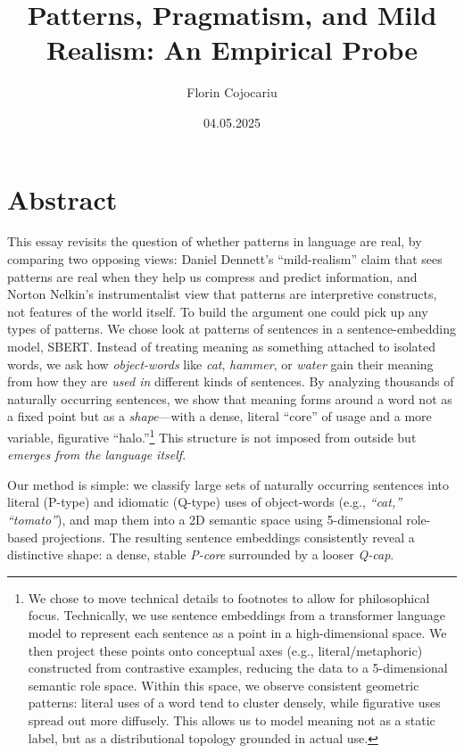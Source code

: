 \documentclass[12pt]{article}
\title{Patterns, Pragmatism, and Mild Realism: An Empirical Probe}
\author{Florin Cojocariu}
\date{04.05.2025}
\begin{document}
\maketitle
\clearpage
\tableofcontents
\setcounter{tocdepth}{3}
\clearpage
\section{Abstract}\label{abstract}

This essay revisits the question of whether patterns in language are real, by comparing two opposing views: Daniel Dennett's ``mild-realism'' claim that sees patterns are real when they help us compress and predict information, and Norton Nelkin's instrumentalist view that patterns are interpretive constructs, not features of the world itself. To build the argument one could pick up any types of patterns. We chose look at patterns of sentences in a sentence-embedding model, SBERT. Instead of treating meaning as something attached to isolated words, we ask how \emph{object-words} like \emph{cat}, \emph{hammer}, or \emph{water} gain their meaning from how they are \emph{used in} different kinds of sentences. By analyzing thousands of naturally occurring sentences, we show that meaning forms around a word not as a fixed point but as a \emph{shape}---with a dense, literal ``core'' of usage and a more variable, figurative ``halo.''\footnote{We chose to move technical details to footnotes to allow for philosophical focus. Technically, we use sentence embeddings from a transformer language model to represent each sentence as a point in a high-dimensional space. We then project these points onto conceptual axes (e.g., literal/metaphoric) constructed from contrastive examples, reducing the data to a 5-dimensional semantic role space. Within this space, we observe consistent geometric patterns: literal uses of a word tend to cluster densely, while figurative uses spread out more diffusely. This allows us to model meaning not as a static label, but as a distributional topology grounded in actual use.} This structure is not imposed from outside but \emph{emerges from the language itself}.

Our method is simple: we classify large sets of naturally occurring sentences into literal (P-type) and idiomatic (Q-type) uses of object-words (e.g., \emph{``cat,'' ``tomato''}), and map them into a 2D semantic space using 5-dimensional role-based projections. The resulting sentence embeddings consistently reveal a distinctive shape: a dense, stable \emph{P-core} surrounded by a looser \emph{Q-cap}.
\end{document}
